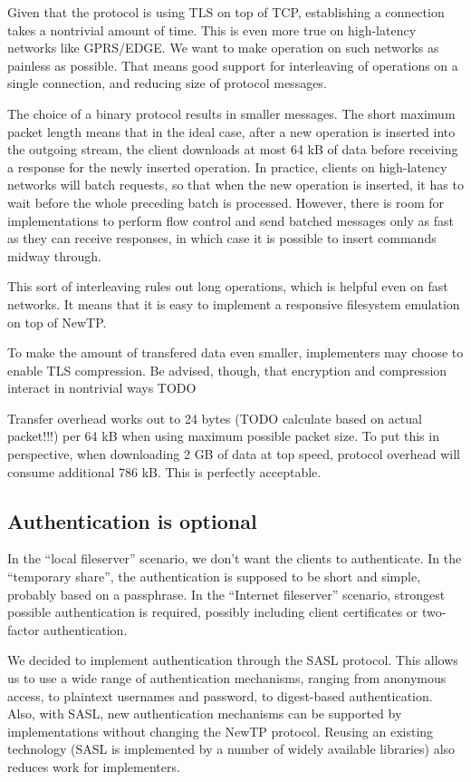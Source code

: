 Given that the protocol is using TLS on top of TCP, establishing a connection takes a nontrivial amount of
time. This is even more true on high-latency networks like GPRS/EDGE. We want to make operation on such
networks as painless as possible. That means good support for interleaving of operations on a single
connection, and reducing size of protocol messages.

The choice of a binary protocol results in smaller messages. The short maximum packet length means that in the
ideal case, after a new operation is inserted into the outgoing stream, the client downloads at most 64 kB of
data before receiving a response for the newly inserted operation. In practice, clients on high-latency
networks will batch requests, so that when the new operation is inserted, it has to wait before the whole
preceding batch is processed. However, there is room for implementations to perform flow control and send
batched messages only as fast as they can receive responses, in which case it is possible to insert commands
midway through.

This sort of interleaving rules out long operations, which is helpful even on fast networks. It means that it
is easy to implement a responsive filesystem emulation on top of NewTP.

To make the amount of transfered data even smaller, implementers may choose to enable TLS compression. Be
advised, though, that encryption and compression interact in nontrivial ways TODO

Transfer overhead works out to 24 bytes (TODO calculate based on actual packet!!!) per 64 kB when using
maximum possible packet size. To put this in perspective, when downloading 2 GB of data at top speed, protocol
overhead will consume additional 786 kB.  This is perfectly acceptable.

%

\subsection{Authentication is optional}

In the ``local fileserver'' scenario, we don't want the clients to authenticate. In the ``temporary share'',
the authentication is supposed to be short and simple, probably based on a passphrase. In the ``Internet
fileserver'' scenario, strongest possible authentication is required, possibly including client certificates
or two-factor authentication.

We decided to implement authentication through the SASL protocol. This allows us to use a wide range of
authentication mechanisms, ranging from anonymous access, to plaintext usernames and password, to digest-based
authentication. Also, with SASL, new authentication mechanisms can be supported by implementations without
changing the NewTP protocol. Reusing an existing technology (SASL is implemented by a number of widely
available libraries) also reduces work for implementers.

